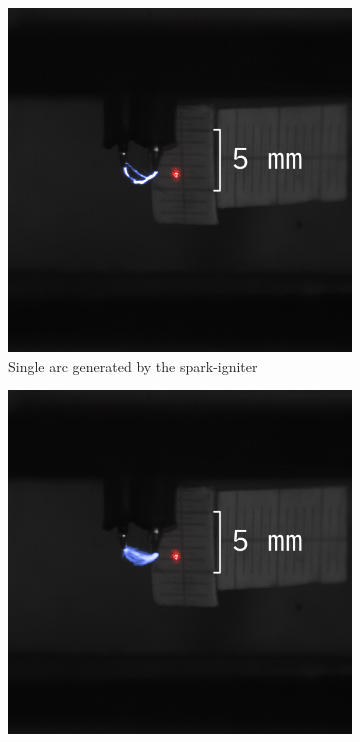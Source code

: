             \begin{figure}[h]
                \centering
                \begin{subfigure}[t]{0.47\textwidth}
                    \centering
                    \includegraphics[]{assets/3 design/sparkAlignment_one.jpg}
                    \caption{Single arc generated by the spark-igniter}
                    \label{fig:sparkAlignment_one}
                \end{subfigure}
                \hfill
                \begin{subfigure}[t]{0.47\textwidth}
                    \centering
                    \includegraphics[]{assets/3 design/sparkAlignment.jpg}

\end{subfigure}
\end{figure}
